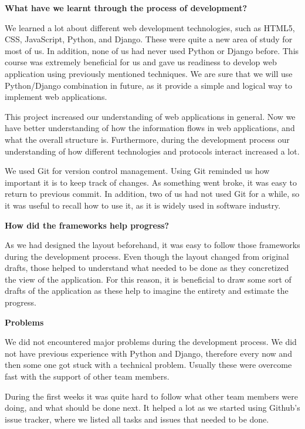\documentclass{sig-alt-release2}
\begin{document}
\vspace{5 mm} \noindent \textbf{What have we learnt through the process of development?}

We learned a lot about different web development technologies, such as HTML5,
CSS, JavaScript, Python, and Django. These were quite a new area of study for
most of us. In addition, none of us had never used Python or Django before. This
course was extremely beneficial for us and gave us readiness to develop web
application using previously mentioned techniques. We are sure that we will use
Python/Django combination in future, as it provide a simple and logical way to
implement web applications.

This project increased our understanding of web applications in general. Now we
have better understanding of how the information flows in web applications, and
what the overall structure is. Furthermore, during the development process our
understanding of how different technologies and protocols interact increased a
lot.

We used Git \cite{x21} for version control management. Using Git reminded us how
important it is to keep track of changes. As something went broke, it was easy
to return to previous commit. In addition, two of us had not used Git for a
while, so it was useful to recall how to use it, as it is widely used in
software industry.

\vspace{5 mm} \noindent \textbf{How did the frameworks help progress?}

As we had designed the layout beforehand, it was easy to follow those frameworks
during the development process. Even though the layout changed from original
drafts, those helped to understand what needed to be done as they concretized
the view of the application. For this reason, it is beneficial to draw
some sort of drafts of the application as these help to imagine the entirety and
estimate the progress.

\vspace{5 mm} \noindent \textbf{Problems}

We did not encountered major problems during the development process. We did not
have previous experience with Python and Django, therefore every now and then
some one got stuck with a technical problem. Usually these were overcome fast
with the support of other team members.

During the first weeks it was quite hard to follow what other team members were
doing, and what should be done next. It helped a lot as we started using
Github's issue tracker, where we listed all tasks and issues that needed to be
done.
\end{document}
